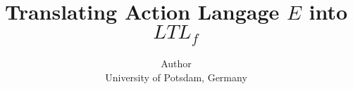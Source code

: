 \documentclass[a4paper]{article}
\begin{document}
\title{Translating Action Langage $E$ into $LTL_f$}

\author{%
  Author\\
  University of Potsdam, Germany
}

\maketitle


%
%
%
%
%

\printbibliography{}
\end{document}
